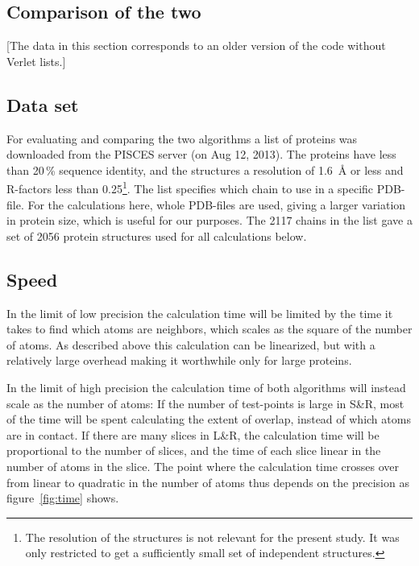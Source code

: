 \documentclass[a4paper,11pt]{article}
\begin{document}
\begin{small}
\section{Comparison of the two}\label{sec:compare}

[The data in this section corresponds to an older version of the code
  without Verlet lists.]

\subsection{Data set}\label{sec:dataset}

For evaluating and comparing the two algorithms a list of proteins was
downloaded from the PISCES server \cite{PISCES} (on Aug 12, 2013). The
proteins have less than 20\,\% sequence identity, and the structures a
resolution of 1.6~Å or less and R-factors less than 0.25\footnote{The
  resolution of the structures is not relevant for the present
  study. It was only restricted to get a sufficiently small set of
  independent structures.}. The list specifies which chain to use in a
specific PDB-file. For the calculations here, whole PDB-files are
used, giving a larger variation in protein size, which is useful for
our purposes. The 2117 chains in the list gave a set of 2056 protein
structures used for all calculations below.

\subsection{Speed}\label{sec:speed}

In the limit of low precision the calculation time will be limited by
the time it takes to find which atoms are neighbors, which scales as
the square of the number of atoms. As described above this calculation
can be linearized, but with a relatively large overhead making it
worthwhile only for large proteins.

In the limit of high precision the calculation time of both algorithms
will instead scale as the number of atoms: If the number of
test-points is large in S\&R, most of the time will be spent
calculating the extent of overlap, instead of which atoms are in
contact. If there are many slices in L\&R, the calculation time will
be proportional to the number of slices, and the time of each slice
linear in the number of atoms in the slice.  The point where the
calculation time crosses over from linear to quadratic in the number
of atoms thus depends on the precision as figure~\ref{fig:time} shows.


\end{small}
\end{document}
